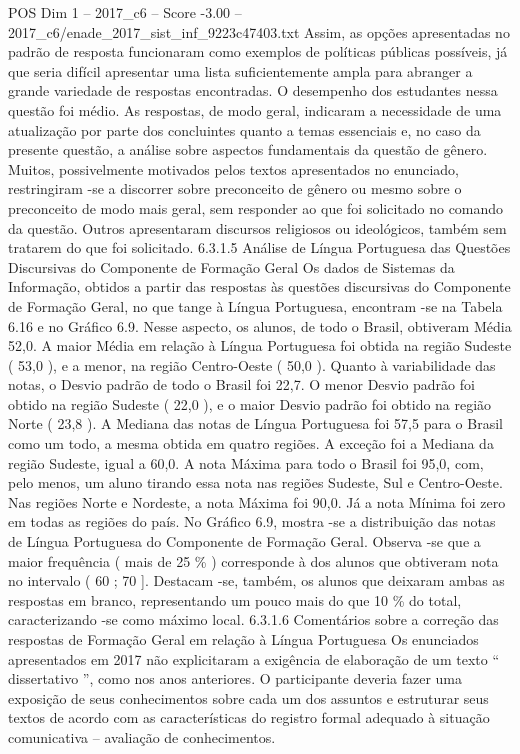 \begin{textsample}{POS Dim 1 – 2017\_c6 – Score -3.00 – 2017\_c6/enade\_2017\_sist\_inf\_9223c47403.txt}
Assim, as opções apresentadas no padrão de resposta funcionaram como exemplos de políticas públicas possíveis, já que seria difícil apresentar uma lista suficientemente ampla para abranger a grande variedade de respostas encontradas.
O desempenho dos estudantes nessa questão foi médio.
As respostas, de modo geral, indicaram a necessidade de uma atualização por parte dos concluintes quanto a temas essenciais e, no caso da presente questão, a análise sobre aspectos fundamentais da questão de gênero.
Muitos, possivelmente motivados pelos textos apresentados no enunciado, restringiram -se a discorrer sobre preconceito de gênero ou mesmo sobre o preconceito de modo mais geral, sem responder ao que foi solicitado no comando da questão.
Outros apresentaram discursos religiosos ou ideológicos, também sem tratarem do que foi solicitado. 6.3.1.5 Análise de Língua Portuguesa das Questões Discursivas do Componente de Formação Geral Os dados de Sistemas da Informação, obtidos a partir das respostas às questões discursivas do Componente de Formação Geral, no que tange à Língua Portuguesa, encontram -se na Tabela 6.16 e no Gráfico 6.9.
Nesse aspecto, os alunos, de todo o Brasil, obtiveram Média 52,0.
A maior Média em relação à Língua Portuguesa foi obtida na região Sudeste ( 53,0 ), e a menor, na região Centro-Oeste ( 50,0 ).
Quanto à variabilidade das notas, o Desvio padrão de todo o Brasil foi 22,7.
O menor Desvio padrão foi obtido na região Sudeste ( 22,0 ), e o maior Desvio padrão foi obtido na região Norte ( 23,8 ).
A Mediana das notas de Língua Portuguesa foi 57,5 para o Brasil como um todo, a mesma obtida em quatro regiões.
A exceção foi a Mediana da região Sudeste, igual a 60,0.
A nota Máxima para todo o Brasil foi 95,0, com, pelo menos, um aluno tirando essa nota nas regiões Sudeste, Sul e Centro-Oeste.
Nas regiões Norte e Nordeste, a nota Máxima foi 90,0.
Já a nota Mínima foi zero em todas as regiões do país.
No Gráfico 6.9, mostra -se a distribuição das notas de Língua Portuguesa do Componente de Formação Geral.
Observa -se que a maior frequência ( mais de 25 \% ) corresponde à dos alunos que obtiveram nota no intervalo ( 60 ; 70 ].
Destacam -se, também, os alunos que deixaram ambas as respostas em branco, representando um pouco mais do que 10 \% do total, caracterizando -se como máximo local. 6.3.1.6 Comentários sobre a correção das respostas de Formação Geral em relação à Língua Portuguesa Os enunciados apresentados em 2017 não explicitaram a exigência de elaboração de um texto “ dissertativo ”, como nos anos anteriores.
O participante deveria fazer uma exposição de seus conhecimentos sobre cada um dos assuntos e estruturar seus textos de acordo com as características do registro formal adequado à situação comunicativa – avaliação de conhecimentos.

\end{textsample}
